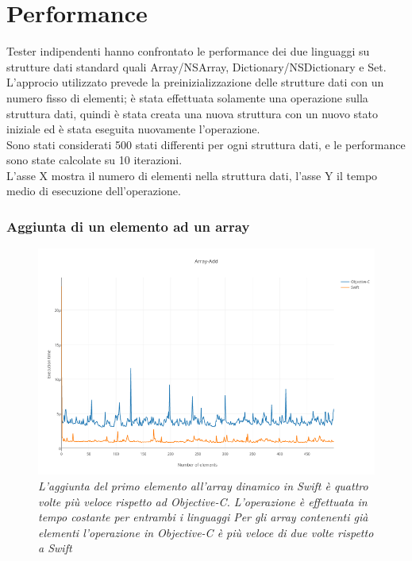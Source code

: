 \section{Performance}
Tester indipendenti hanno confrontato le performance dei due linguaggi su strutture dati standard quali Array/NSArray, Dictionary/NSDictionary e Set.\\
L'approcio utilizzato prevede la preinizializzazione delle strutture dati con un numero fisso di elementi; è stata effettuata solamente una operazione sulla struttura dati, quindi è stata creata una nuova struttura con un nuovo stato iniziale ed è stata eseguita nuovamente l'operazione.\\ Sono stati considerati 500 stati differenti per ogni struttura dati, e le performance sono state calcolate su 10 iterazioni.\\L'asse X mostra il numero di elementi nella struttura dati, l'asse Y il tempo medio di esecuzione dell'operazione.
\subsubsection{Aggiunta di un elemento ad un array}
\begin{figure}[H]
      \centering
      \includegraphics[scale=0.50]{immagini/array_add.png}
            \vspace{0.8cm}
            \caption{\textit{L'aggiunta del primo elemento all'array dinamico in Swift è quattro volte più veloce rispetto ad Objective-C.
L'operazione è effettuata in tempo costante per entrambi i linguaggi
Per gli array contenenti già elementi l'operazione in Objective-C è più veloce di due volte rispetto a Swift}}
\end{figure}
